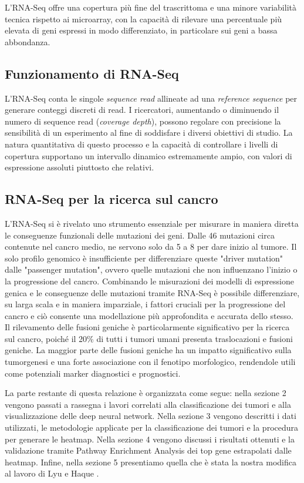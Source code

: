 L'RNA-Seq offre una copertura più fine del trascrittoma e una minore 
variabilità tecnica rispetto ai microarray, con la capacità di rilevare una 
percentuale più elevata di geni espressi in modo differenziato, in particolare 
sui geni a bassa abbondanza.

\subsection{Funzionamento di RNA-Seq}
L'RNA-Seq conta le singole \textit{sequence read} allineate ad una \textit{reference sequence} per
generare conteggi discreti di read. I ricercatori, aumentando o diminuendo
il numero di sequence read (\textit{coverage depth}), possono regolare con precisione
la sensibilità di un esperimento al fine di soddisfare i diversi obiettivi di studio.
La natura quantitativa di questo processo e la capacità di controllare i 
livelli di copertura supportano un intervallo dinamico estremamente ampio, 
con valori di espressione assoluti piuttosto che relativi.

\subsection{RNA-Seq per la ricerca sul cancro}
L'RNA-Seq si è rivelato uno strumento essenziale per misurare in maniera diretta
le conseguenze funzionali delle mutazioni dei geni. Dalle 46 mutazioni circa contenute
nel cancro medio, ne servono solo da 5 a 8 per dare inizio al tumore.
Il solo profilo genomico è insufficiente per differenziare queste "driver mutation"
dalle "passenger mutation", ovvero quelle mutazioni che non influenzano l'inizio
o la progressione del cancro. Combinando le misurazioni dei modelli di espressione
genica e le conseguenze delle mutazioni tramite RNA-Seq è possibile differenziare,
su larga scala e in maniera imparziale, i fattori cruciali per la progressione
del cancro e ciò consente una modellazione più approfondita e accurata dello stesso.
Il rilevamento delle fusioni geniche è particolarmente significativo per la 
ricerca sul cancro, poiché il 20\% di tutti i tumori umani presenta 
traslocazioni e fusioni geniche. La maggior parte delle fusioni geniche ha un 
impatto significativo sulla tumorgenesi e una forte associazione con il 
fenotipo morfologico, rendendole utili come potenziali marker diagnostici e 
prognostici.

\vspace{5mm}
La parte restante di questa relazione è organizzata come segue: nella sezione 2 vengono passati 
a rassegna i lavori correlati alla classificazione dei tumori e alla visualizzazione delle deep neural network. 
Nella sezione 3 vengono descritti i dati utilizzati, le metodologie applicate per la classificazione dei 
tumori e la procedura per generare le heatmap. 
Nella sezione 4 vengono discussi i risultati ottenuti e la validazione tramite 
Pathway Enrichment Analysis dei top gene estrapolati dalle heatmap. Infine, nella sezione 5 presentiamo
quella che è stata la nostra modifica al lavoro di Lyu e Haque \cite{lyu2018deep}.